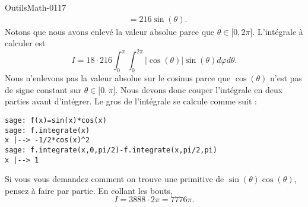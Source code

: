 \begin{corrige}{OutilsMath-0117}
\begin{subequations}
\begin{align}
            &=216\sin(\theta).
        \end{align}
    \end{subequations}
    Notons que nous avons enlevé la valeur absolue parce que \( \theta\in\mathopen[ 0 , 2\pi \mathclose]\). L'intégrale à calculer est 
    \begin{equation}
        I=18\cdot 216\int_0^{\pi}\int_0^{2\pi}|\cos(\theta)|\sin(\theta)d\varphi d\theta.
    \end{equation}
    Nous n'enlevons pas la valeur absolue sur le cosinus parce que \( \cos(\theta)\) n'est pas de signe constant sur \( \theta\in \mathopen[ 0 , \pi \mathclose]\). Nous devons donc couper l'intégrale en deux parties avant d'intégrer. Le gros de l'intégrale se calcule comme suit :
    \begin{verbatim}
sage: f(x)=sin(x)*cos(x)                                                                                                                   
sage: f.integrate(x)
x |--> -1/2*cos(x)^2
sage: f.integrate(x,0,pi/2)-f.integrate(x,pi/2,pi)
x |--> 1
    \end{verbatim}
    Si vous vous demandez comment on trouve une primitive de \( \sin(\theta)\cos(\theta)\), pensez à faire par partie. En collant les bouts,
    \begin{equation}
        I=3888\cdot 2\pi=7776\pi.
    \end{equation}

\end{corrige}
